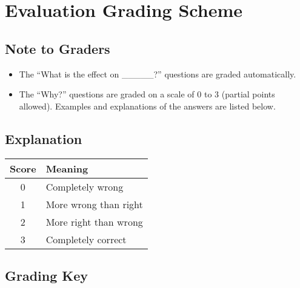 \chapter{Evaluation Grading Scheme}

\section{Note to Graders}

\begin{itemize}
\item The ``What is the effect on \_\_\_\_\_?'' questions are graded automatically.
\item The ``Why?'' questions are graded on a scale of 0 to 3 (partial points allowed).  Examples and explanations of the answers are listed below.
\end{itemize}

\section{Explanation}

\begin{tabular}{| c | l |} \hline
\rowcolor{gray!35} \textbf{Score} & \textbf{Meaning} \\ \hline
0 & Completely wrong \\ 
1 & More wrong than right \\ 
2 & More right than wrong \\ 
3 & Completely correct \\
\hline
\end{tabular}

\section{Grading Key}

